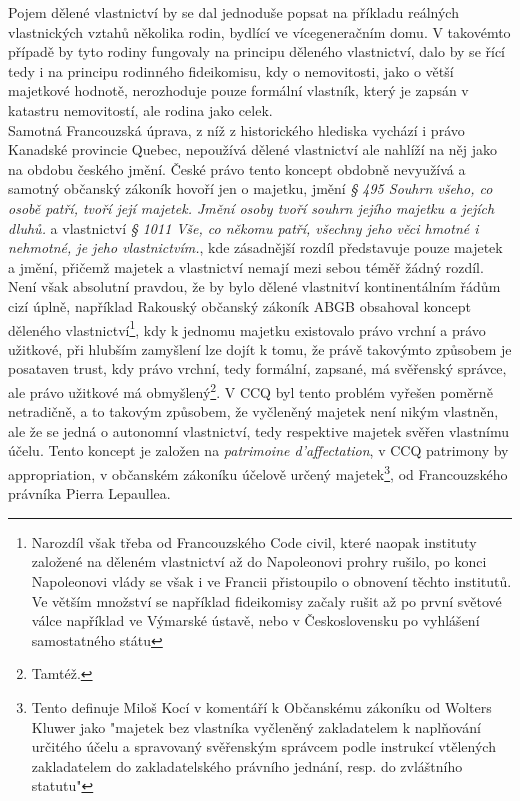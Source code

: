 \documentclass{article}
\begin{document}
Pojem dělené vlastnictví by se dal jednoduše popsat na příkladu reálných vlastnických vztahů několika rodin, bydlící ve vícegeneračním domu. V takovémto případě by tyto rodiny fungovaly na principu děleného vlastnictví, dalo by se řící tedy i na principu rodinného fideikomisu, kdy o nemovitosti, jako o větší majetkové hodnotě, nerozhoduje pouze formální vlastník, který je zapsán v katastru nemovitostí, ale rodina jako celek.\\

Samotná Francouzská úprava, z níž z historického hlediska vychází i právo Kanadské provincie Quebec, nepoužívá dělené vlastnictví ale nahlíží na něj jako na obdobu českého jmění. České právo tento koncept obdobně nevyužívá a samotný občanský zákoník hovoří jen o majetku, jmění \textit{§ 495 Souhrn všeho, co osobě patří, tvoří její majetek. Jmění osoby tvoří souhrn jejího majetku a jejích dluhů.} a vlastnictví \textit{§ 1011 Vše, co někomu patří, všechny jeho věci hmotné i nehmotné, je jeho vlastnictvím.}, kde zásadnější rozdíl představuje pouze majetek a jmění, přičemž majetek a vlastnictví nemají mezi sebou téměř žádný rozdíl.\\

Není však absolutní pravdou, že by bylo dělené vlastnitví kontinentálním řádům cizí úplně, například Rakouský občanský zákoník ABGB obsahoval koncept děleného vlastnictví\footnote{Narozdíl však třeba od Francouzského Code civil, které naopak instituty založené na děleném vlastnictví až do Napoleonovi prohry rušilo, po konci Napoleonovi vlády se však i ve Francii přistoupilo o obnovení těchto institutů. Ve větším množství se například fideikomisy začaly rušit až po první světové válce například ve Výmarské ústavě, nebo v Československu po vyhlášení samostatného státu}, kdy k jednomu majetku existovalo právo vrchní a právo užitkové, při hlubším zamyšlení lze dojít k tomu, že právě takovýmto způsobem je posataven trust, kdy právo vrchní, tedy formální, zapsané, má svěřenský správce, ale právo užitkové má obmyšlený\footnote{Tamtéž.}. V CCQ byl tento problém vyřešen poměrně netradičně, a to takovým způsobem, že vyčleněný majetek není nikým vlastněn, ale že se jedná o autonomní vlastnictví, tedy respektive majetek svěřen vlastnímu účelu. Tento koncept je založen na \textit{patrimoine d'affectation}, v CCQ patrimony by appropriation, v občanském zákoníku účelově určený majetek\footnote{Tento definuje Miloš Kocí v komentáří k Občanskému zákoníku od Wolters Kluwer jako "majetek bez vlastníka vyčleněný zakladatelem k naplňování určitého účelu a spravovaný svěřenským správcem podle instrukcí vtělených zakladatelem do zakladatelského právního jednání, resp. do zvláštního statutu"}, od Francouzského právníka Pierra Lepaullea.\\ 
\end{document}
